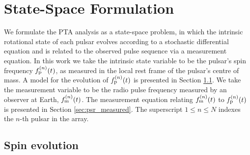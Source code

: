 \documentclass[fleqn,usenatbib,useAMS]{mnras}
\begin{document}
%

%
%



\section{State-Space Formulation}\label{sec:model}
We formulate the PTA analysis as a state-space problem, in which the intrinsic rotational state of each pulsar evolves according to a stochastic differential equation and is related to the observed pulse sequence via a measurement equation. In this work we take the intrinsic state variable to be the pulsar's spin frequency $f_{\rm p}^{(n)}(t)$, as measured in the local rest frame of the pulsar's centre of mass. A model for the evolution of $f_{\rm p}^{(n)}(t)$ is presented in Section \ref{sec:psr_frequency}.  We take the measurement variable to be the radio pulse frequency measured by an observer at Earth, $f_{\rm m}^{(n)}(t)$.  The measurement equation relating $f_{\rm m}^{(n)}(t)$ to $f_{\rm p}^{(n)}(t)$ is presented in Section \ref{sec:psr_measured}. The superscript $1\leq n\leq N$ indexes the $n$-th pulsar in the array.
\subsection{Spin evolution} \label{sec:psr_frequency}
\end{document}
